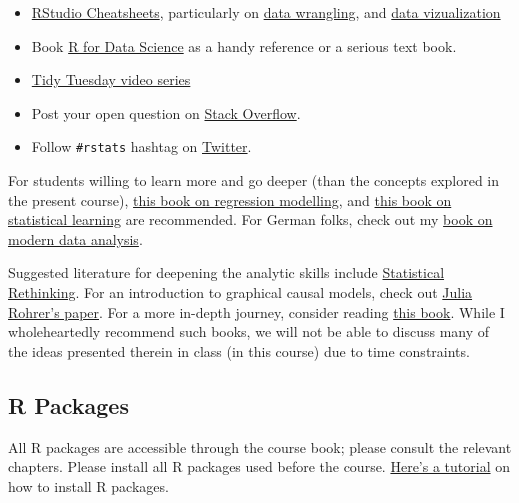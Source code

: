 \documentclass[
  letterpaper,
  DIV=11,
  numbers=noendperiod]{scrreprt}
\theoremstyle{definition}
\theoremstyle{definition}
\theoremstyle{remark}
\begin{document}
\begin{itemize}
\item
  \href{https://rstudio.com/resources/cheatsheets/}{RStudio
  Cheatsheets}, particularly on
  \href{https://github.com/rstudio/cheatsheets/raw/master/data-transformation.pdf}{data
  wrangling}, and
  \href{https://github.com/rstudio/cheatsheets/raw/master/data-visualization-2.1.pdf}{data
  vizualization}
\item
  Book \href{https://r4ds.had.co.nz/index.html}{R for Data Science} as a
  handy reference or a serious text book.
\item
  \href{https://www.youtube.com/results?search_query=tidytuesday}{Tidy
  Tuesday video series}
\item
  Post your open question on \href{https://stackoverflow.com/}{Stack
  Overflow}.
\item
  Follow \texttt{\#rstats} hashtag on
  \href{https://twitter.com/search?q=\%23rstats\&src=typed_query}{Twitter}.
\end{itemize}

For students willing to learn more and go deeper (than the concepts
explored in the present course),
\href{http://www.stat.columbia.edu/~gelman/arm/}{this book on regression
modelling}, and
\href{http://faculty.marshall.usc.edu/gareth-james/ISL/}{this book on
statistical learning} are recommended. For German folks, check out my
\href{https://www.springer.com/de/book/9783658215866}{book on modern
data analysis}.

Suggested literature for deepening the analytic skills include
\href{https://xcelab.net/rm/statistical-rethinking/}{Statistical
Rethinking}. For an introduction to graphical causal models, check out
\href{https://journals.sagepub.com/doi/full/10.1177/2515245917745629}{Julia
Rohrer's paper}. For a more in-depth journey, consider reading
\href{https://books.google.de/books/about/Counterfactuals_and_Causal_Inference.html?id=lFTP49c5wJoC\&redir_esc=y}{this
book}. While I wholeheartedly recommend such books, we will not be able
to discuss many of the ideas presented therein in class (in this course)
due to time constraints.

\hypertarget{packages}{%
\subsection*{R Packages}\label{packages}}

All R packages are accessible through the course book; please consult
the relevant chapters. Please install all R packages used before the
course.
\href{https://moderndive.com/1-getting-started.html\#packages}{Here's a
tutorial} on how to install R packages.
\end{document}
